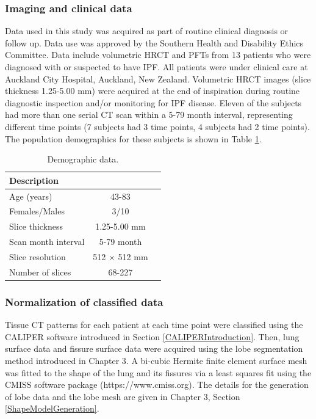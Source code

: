 \subsubsection{Imaging and clinical data}
Data used in this study was acquired as part of routine clinical diagnosis or follow up. Data use was approved by the Southern Health and Disability Ethics Committee. Data include volumetric HRCT and PFTs from 13 patients who were diagnosed with or suspected to have IPF. All patients were under clinical care at Auckland City Hospital, Auckland, New Zealand. Volumetric HRCT images (slice thickness 1.25-5.00 mm) were acquired at the end of inspiration during routine diagnostic inspection and/or monitoring for IPF disease. Eleven of the subjects had more than one serial CT scan within a 5-79 month interval, representing different time points (7 subjects had 3 time points, 4 subjects had 2 time points). The population demographics for these subjects is shown in Table \ref{tab:DemographicData}.
\newpage

\begin{table}[h]
\centering
\caption{Demographic data.}
\label{tab:DemographicData}
\begin{tabular}{| l  | c | c|}
\hline
{\bf Description}  \\ \hline
Age (years) & 43-83 \\
\hline
Females/Males	& 3/10 \\
\hline
Slice thickness	& 1.25-5.00 mm \\
\hline
Scan month interval	& 5-79 month \\
\hline
Slice resolution	& 512 $\times$ 512 mm \\
\hline
Number of slices	& 68-227
\\ \hline
\end{tabular}
\end{table}

\subsubsection{Normalization of classified data} \label{DataNormalization}
Tissue CT patterns for each patient at each time point were classified using the CALIPER software introduced in Section \ref{CALIPERIntroduction}. Then, lung surface data and fissure surface data were acquired using the lobe segmentation method introduced in Chapter 3. A bi-cubic Hermite finite element surface mesh was fitted to the shape of the lung and its fissures via a least squares fit using the CMISS software package (https://www.cmiss.org). The details for the generation of lobe data and the lobe mesh are given in Chapter 3, Section \ref{ShapeModelGeneration}.

